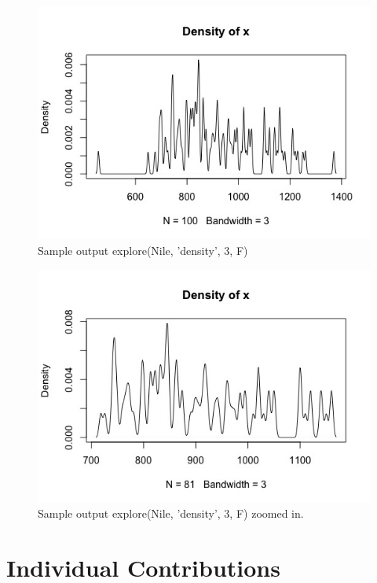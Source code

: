 \documentclass{article}
\begin{document}
\begin{figure}[H]
\centering
\includegraphics[scale=0.5]{Nile, 3 density before zoom.jpeg}
\caption{Sample output explore(Nile, 'density', 3, F) }
\label{fig:Nile density graph 3}
\end{figure}


\begin{figure}[H]
\centering
\includegraphics[scale=0.5]{Nile, 3 density after zoom in.jpeg}
\caption{Sample output explore(Nile, 'density', 3, F) zoomed in. }
\label{fig:Nile density graph 3, zoom in}
\end{figure}




\section{Individual Contributions}
\end{document}
